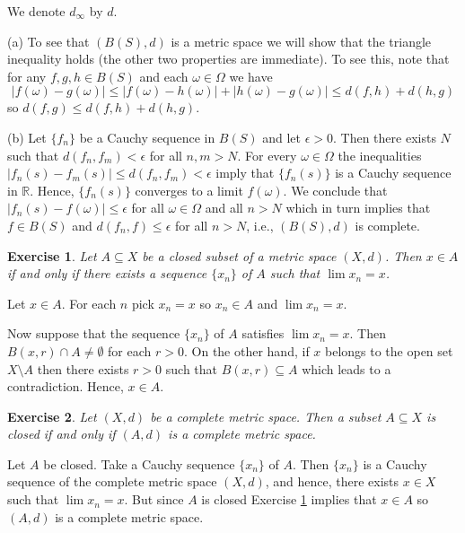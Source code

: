 \documentclass[letter,11pt]{article}
\newtheorem{exercise}{Exercise}[section]
\begin{document}
We denote $d_{\infty} $ by $d$.



(a) To see that $(B(S),d)$ is a metric space we will show that the triangle inequality holds (the other two properties are immediate). To see this, note that for any $f,g,h \in B(S)$ and each $\omega \in \Omega$ we have 
$$|f(\omega) - g(\omega) | \leq |f(\omega) - h(\omega)| + |h(\omega) - g(\omega)| \leq d(f,h) + d(h,g) $$
so $d(f,g) \leq  d(f,h) + d(h,g)$. 

(b) Let $\{ f_{n} \}$ be a Cauchy sequence in $B(S)$ and let $\epsilon >0$. Then there exists $N$ such that $d(f_{n},f_{m}) < \epsilon$ for all $n,m>N$. For every $\omega \in \Omega$ the inequalities $|f_{n}(s) - f_{m}(s)| \leq d(f_{n},f_{m}) < \epsilon$ imply that $\{ f_{n}(s) \}$ is a Cauchy sequence in $\mathbb{R}$. Hence, $\{ f_{n}(s) \}$ converges to a limit $f(\omega)$. We conclude that $|f_{n}(s) - f(\omega) | \leq \epsilon$ for all $\omega \in \Omega$ and all $n > N$ which in turn implies that $f \in B(S)$ and $d(f_{n},f) \leq \epsilon$ for all $n>N$, i.e., $(B(S),d)$ is complete. 




\begin{exercise} \label{Ex: lim A closed}
    Let $A \subseteq X$ be a closed subset of a metric space $(X,d)$. Then $x \in A$ if and only if there exists a sequence $\{x_{n} \}$ of $A$ such that $\lim x_{n} = x$. 
\end{exercise}

Let $x \in A$. For each $n$ pick $x_{n} =x$ so $x_{n} \in A$ and $\lim x_{n} = x$. 


Now suppose that the sequence  $\{x_{n} \}$ of $A$ satisfies $\lim x_{n} = x$. Then $B(x,r) \cap A \neq \emptyset$ for each $r >0$. On the other hand, if $x$ belongs to the open set $X \setminus A$ then there exists $r >0$ such that $B(x,r) \subseteq A$ which leads to a contradiction. Hence, $x \in A$.



\begin{exercise}
    Let $(X,d)$ be a complete metric space. Then a subset $A \subseteq X$ is closed if and only if $(A,d)$ is a complete metric space. 
\end{exercise}

Let $A$ be closed. Take a Cauchy sequence $\{x_{n} \}$ of $A$. Then  $\{x_{n} \}$  is a Cauchy sequence of the complete metric space $(X,d)$, and hence, there exists $x \in X$ such that $\lim x_{n} =x$. But since $A$ is closed  Exercise \ref{Ex: lim A closed} implies that $x \in A$ so $(A,d)$ is a complete metric space. 
\end{document}
